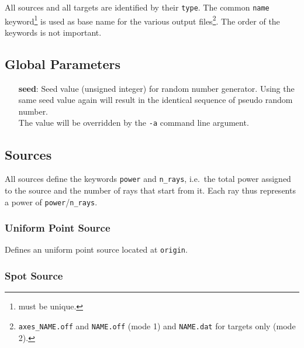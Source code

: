 \documentclass[10pt,a4paper,titlepage]{article}
\begin{document}
All sources and all targets are identified by their {\tt type}. The common {\tt name} keyword\footnote{must be unique.} is used as base name for the various output files\footnote{{\tt axes\_NAME.off} and {\tt NAME.off} (mode 1)  and {\tt NAME.dat} for targets only (mode 2).}. The order of the keywords is not important.

\subsection{Global Parameters}
\begin{itemize}
\item[{\bf seed}:]{Seed value (unsigned integer) for random number generator. Using the same seed value again will result in the identical sequence of pseudo random number.\\
The value will be overridden by the {\tt -a} command line argument.}
\end{itemize}



\subsection{Sources}

All sources define the keywords {\tt power} and {\tt n\_rays}, i.e.~the total power assigned to the source and the number of rays that start from it. Each ray thus represents a power of {\tt power}/{\tt n\_rays}.

\subsubsection{Uniform Point Source}






Defines an uniform point source located at {\tt origin}.


\subsubsection{Spot Source}


\end{document}

